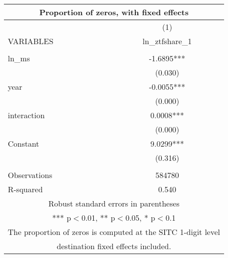\begin{tabular}{lc}
\multicolumn{2}{c}{Proportion of zeros, with fixed effects} \\ \hline
 & (1) \\
VARIABLES & ln\_ztfshare\_1 \\ \hline
 &  \\
ln\_ms & -1.6895*** \\
 & (0.030) \\
year & -0.0055*** \\
 & (0.000) \\
interaction & 0.0008*** \\
 & (0.000) \\
Constant & 9.0299*** \\
 & (0.316) \\
 &  \\
Observations & 584780 \\
 R-squared & 0.540 \\ \hline
\multicolumn{2}{c}{ Robust standard errors in parentheses} \\
\multicolumn{2}{c}{ *** p$<$0.01, ** p$<$0.05, * p$<$0.1} \\
\multicolumn{2}{c}{ The proportion of zeros is computed at the SITC 1-digit level} \\
\multicolumn{2}{c}{ destination fixed effects included.} \\
\end{tabular}
